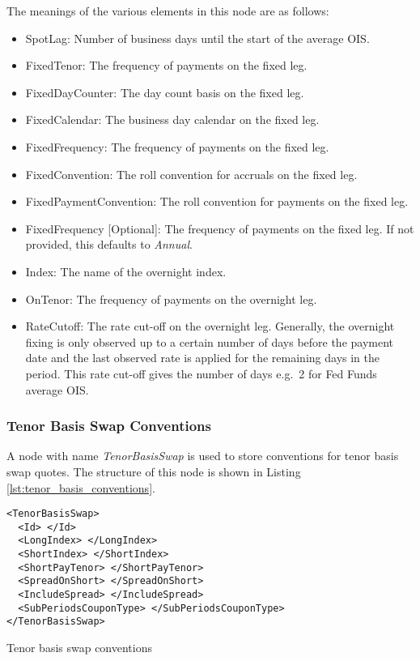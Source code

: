 The meanings of the various elements in this node are as follows:
\begin{itemize}
\item SpotLag: Number of business days until the start of the average OIS.
\item FixedTenor: The frequency of payments on the fixed leg.
\item FixedDayCounter: The day count basis on the fixed leg.
\item FixedCalendar: The business day calendar on the fixed leg.
\item FixedFrequency: The frequency of payments on the fixed leg.
\item FixedConvention: The roll convention for accruals on the fixed leg.
\item FixedPaymentConvention: The roll convention for payments on the fixed leg.
\item FixedFrequency [Optional]: The frequency of payments on the fixed leg. If not provided, this defaults to \emph{Annual}.
\item Index: The name of the overnight index.
\item OnTenor: The frequency of payments on the overnight leg.
\item RateCutoff: The rate cut-off on the overnight leg. Generally, the overnight fixing is only observed up to a
certain number of days before the payment date and the last observed rate is applied for the remaining days in the
period. This rate cut-off gives the number of days e.g.\ 2 for Fed Funds average OIS.
\end{itemize}

\subsubsection{Tenor Basis Swap Conventions}
A node with name \emph{TenorBasisSwap} is used to store conventions for tenor basis swap quotes. The structure of this 
node is shown in Listing \ref{lst:tenor_basis_conventions}.

\begin{listing}[H]
\begin{verbatim}
<TenorBasisSwap>
  <Id> </Id>
  <LongIndex> </LongIndex>
  <ShortIndex> </ShortIndex>
  <ShortPayTenor> </ShortPayTenor>
  <SpreadOnShort> </SpreadOnShort>
  <IncludeSpread> </IncludeSpread>
  <SubPeriodsCouponType> </SubPeriodsCouponType>
</TenorBasisSwap>
\end{verbatim}
\caption{Tenor basis swap conventions}
\label{lst:tenor_basis_conventions}
\end{listing}


